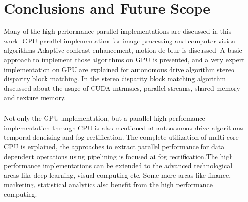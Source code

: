 \chapter{Conclusions and Future Scope}
Many of the high performance parallel implementations are discussed in this work. GPU parallel implementation for image processing and computer vision algorithms Adaptive contrast enhancement, motion de-blur is discussed. A basic approach to implement those algorithms on GPU is presented, and a very expert implementation on GPU are explained for autonomous drive algorithm stereo disparity block matching. In the stereo disparity block matching algorithm discussed about the usage of CUDA intrinsics, parallel streams, shared memory and texture memory.

\paragraph*{}Not only the GPU implementation, but a parallel high performance implementation through CPU is also mentioned at autonomous drive algorithms temporal denoising and fog rectification. The complete utilization of multi-core CPU is explained, the approaches to extract parallel performance for data dependent operations using pipelining is focused at fog rectification.The high performance implementations can be extended to the advanced technological areas like deep learning, visual computing etc. Some more areas like finance, marketing, statistical analytics also benefit from the high performance computing. 